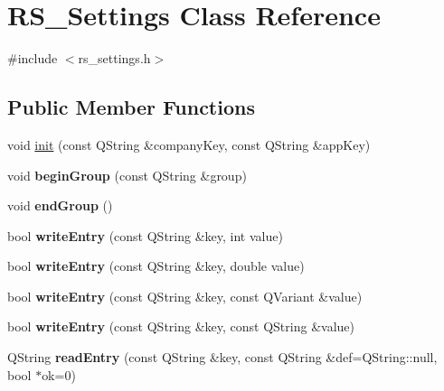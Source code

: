 \hypertarget{classRS__Settings}{\section{R\-S\-\_\-\-Settings Class Reference}
\label{classRS__Settings}
}


{\ttfamily \#include $<$rs\-\_\-settings.\-h$>$}

\subsection*{Public Member Functions}
\begin{DoxyCompactItemize}
\item 
void \hyperlink{classRS__Settings_a825b0f1d45c581232e009c261c5060e5}{init} (const Q\-String \&company\-Key, const Q\-String \&app\-Key)
\item 
\hypertarget{classRS__Settings_ae77f751f8aa5b4a94fc511102569395b}{void {\bfseries begin\-Group} (const Q\-String \&group)}\label{classRS__Settings_ae77f751f8aa5b4a94fc511102569395b}

\item 
\hypertarget{classRS__Settings_a3d70cb2192c0cc3b810cf2f963fe7f7f}{void {\bfseries end\-Group} ()}\label{classRS__Settings_a3d70cb2192c0cc3b810cf2f963fe7f7f}

\item 
\hypertarget{classRS__Settings_ae64bba2346f0207b92760200e63ff95a}{bool {\bfseries write\-Entry} (const Q\-String \&key, int value)}\label{classRS__Settings_ae64bba2346f0207b92760200e63ff95a}

\item 
\hypertarget{classRS__Settings_a3b9e9e302dc97de4734d8f46f4db4d35}{bool {\bfseries write\-Entry} (const Q\-String \&key, double value)}\label{classRS__Settings_a3b9e9e302dc97de4734d8f46f4db4d35}

\item 
\hypertarget{classRS__Settings_a5a2d47244610be26e2fa6934d03d9e89}{bool {\bfseries write\-Entry} (const Q\-String \&key, const Q\-Variant \&value)}\label{classRS__Settings_a5a2d47244610be26e2fa6934d03d9e89}

\item 
\hypertarget{classRS__Settings_ad8594fd48fad3e8c346d2a29e5b80a57}{bool {\bfseries write\-Entry} (const Q\-String \&key, const Q\-String \&value)}\label{classRS__Settings_ad8594fd48fad3e8c346d2a29e5b80a57}

\item 
\hypertarget{classRS__Settings_ae55f5d0beac3db3b618197c94745b0e9}{Q\-String {\bfseries read\-Entry} (const Q\-String \&key, const Q\-String \&def=Q\-String\-::null, bool $\ast$ok=0)}\label{classRS__Settings_ae55f5d0beac3db3b618197c94745b0e9}


\end{DoxyCompactItemize}
